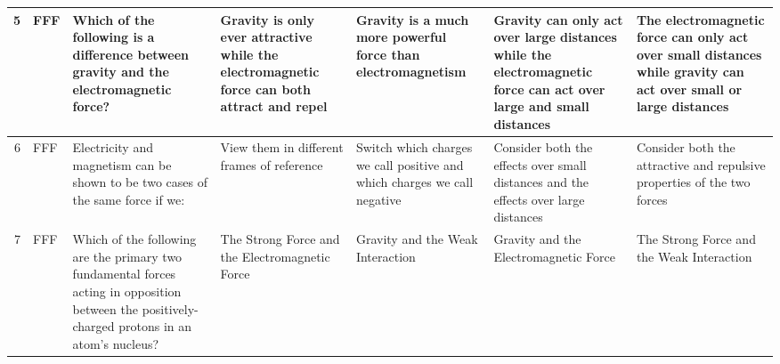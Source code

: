 \documentclass[10pt]{article}
\begin{document}
\begin{tiny}
\begin{longtable}{|r|p{0.375in}|p{1.275in}|p{0.75in}|p{0.75in}|p{0.75in}|p{0.75in}|}
    5     &     FFF &                                                                                                                                                                                            Which of the following is a difference between gravity and the electromagnetic force? &                                            Gravity is only ever attractive while the electromagnetic force can both attract and repel &                                           Gravity is a much more powerful force than electromagnetism &           Gravity can only act over large distances while the electromagnetic force can act over large and small distances &                   The electromagnetic force can only act over small distances while gravity can act over small or large distances \\\hline
    6     &     FFF &                                                                                                                                                                                                  Electricity and magnetism can be shown to be two cases of the same force if we: &                                                                                            View them in different frames of reference &                              Switch which charges we call positive and which charges we call negative &                                        Consider both the effects over small distances and the effects over large distances &                                                           Consider both the attractive and repulsive properties of the two forces \\\hline
    7     &     FFF &                                                                                                                                  Which of the following are the primary two fundamental forces acting in opposition between the positively-charged protons in an atom's nucleus? &                                                                                        The Strong Force and the Electromagnetic Force &                                                                      Gravity and the Weak Interaction &                                                                                      Gravity and the Electromagnetic Force &                                                                                         The Strong Force and the Weak Interaction \\\hline

\end{longtable}
\end{tiny}
\end{document}
